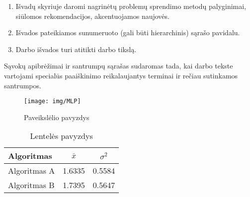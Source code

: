 \documentclass[
]{VUMIFSEMasterThesis}
\begin{document}
\begin{enumerate}[labelindent=0pt]
    \item Išvadų skyriuje daromi nagrinėtų problemų sprendimo metodų palyginimai, siūlomos
rekomendacijos, akcentuojamos naujovės.
    \item Išvados pateikiamos sunumeruoto (gali būti hierarchinis) sąrašo pavidalu.
    \item Darbo išvados turi atitikti darbo tikslą.
\end{enumerate}

\printbibliography[heading=bibintoc]  %

Sąvokų apibrėžimai ir santrumpų sąrašas sudaromas tada, kai darbo tekste
vartojami specialūs paaiškinimo reikalaujantys terminai ir rečiau sutinkamos
santrumpos.


\begin{figure}[H]
    \centering
    \texttt{[image: img/MLP]}
    \caption{Paveikslėlio pavyzdys}
    \label{img:mlp}
\end{figure}



\begin{table}[H]\footnotesize
  \centering
  \caption{Lentelės pavyzdys}
  {\begin{tabular}{|l|c|c|} \hline
    Algoritmas & $\bar{x}$ & $\sigma^{2}$ \\
    \hline
    Algoritmas A  & 1.6335    & 0.5584       \\
    Algoritmas B  & 1.7395    & 0.5647       \\
    \hline
  \end{tabular}}
  \label{tab:table example}
\end{table}
\end{document}
